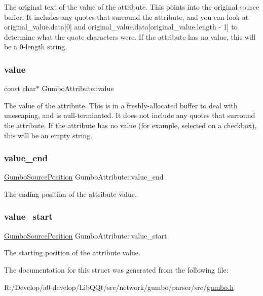 The original text of the value of the attribute. This points into the original source buffer. It includes any quotes that surround the attribute, and you can look at original\+\_\+value.\+data\mbox{[}0\mbox{]} and original\+\_\+value.\+data\mbox{[}original\+\_\+value.\+length -\/ 1\mbox{]} to determine what the quote characters were. If the attribute has no value, this will be a 0-\/length string. \mbox{\label{struct_gumbo_attribute_ae4c9dc6fcd5614d17595e43f2a90da13}} 
\subsubsection{\texorpdfstring{value}{value}}
{\footnotesize\ttfamily const char$\ast$ Gumbo\+Attribute\+::value}

The value of the attribute. This is in a freshly-\/allocated buffer to deal with unescaping, and is null-\/terminated. It does not include any quotes that surround the attribute. If the attribute has no value (for example, \textquotesingle{}selected\textquotesingle{} on a checkbox), this will be an empty string. \mbox{\label{struct_gumbo_attribute_a5b1fa5fb25a8bd65dc02f8a282a5c73e}} 
\subsubsection{\texorpdfstring{value\+\_\+end}{value\_end}}
{\footnotesize\ttfamily \mbox{\hyperlink{struct_gumbo_source_position}{Gumbo\+Source\+Position}} Gumbo\+Attribute\+::value\+\_\+end}

The ending position of the attribute value. \mbox{\label{struct_gumbo_attribute_a8ee577ccb724a649538adce8bff17c86}} 
\subsubsection{\texorpdfstring{value\+\_\+start}{value\_start}}
{\footnotesize\ttfamily \mbox{\hyperlink{struct_gumbo_source_position}{Gumbo\+Source\+Position}} Gumbo\+Attribute\+::value\+\_\+start}

The starting position of the attribute value. 

The documentation for this struct was generated from the following file\+:\begin{DoxyCompactItemize}
\item 
R\+:/\+Develop/a0-\/develop/\+Lib\+Q\+Qt/src/network/gumbo/parser/src/\mbox{\hyperlink{gumbo_8h}{gumbo.\+h}}\end{DoxyCompactItemize}
